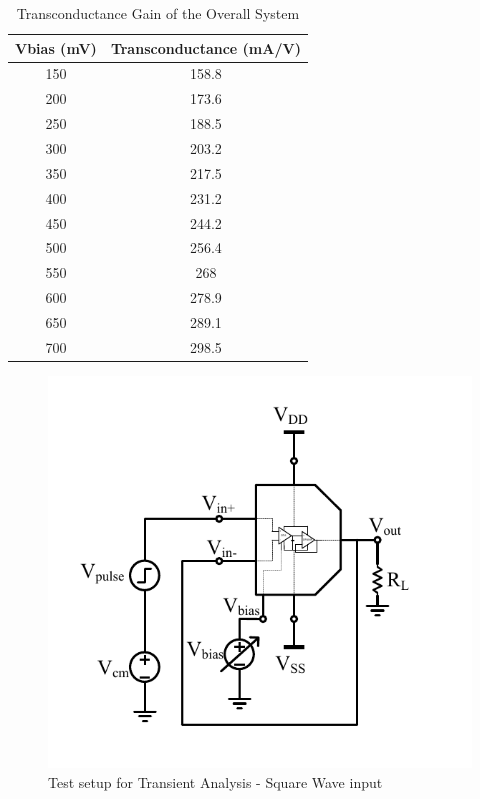 \begin{table} [H]
\centering
\begin{tabular}{@{}cc@{}}
\toprule
Vbias (mV)			& Transconductance (mA/V)	\\ \midrule
150					& 158.8 \\
200					& 173.6 \\
250					& 188.5 \\
300					& 203.2 \\
350					& 217.5 \\
400					& 231.2 \\
450					& 244.2 \\
500					& 256.4 \\
550					& 268 \\
600					& 278.9 \\
650					& 289.1 \\
700 				& 298.5 \\
\bottomrule
\end{tabular}
\caption{Transconductance Gain of the Overall System}
\end{table}

\begin{figure} [H]
\centering
\includegraphics[scale=1]{Figures/Test_Benches/Overall/SLEW.pdf}
\caption{Test setup for Transient Analysis - Square Wave input}
\end{figure}

